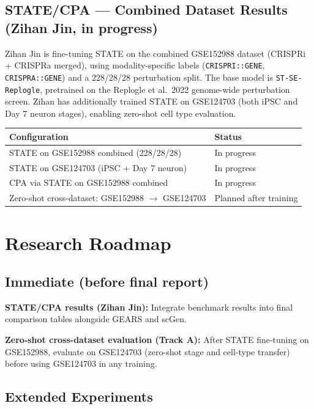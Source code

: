 \documentclass[11pt,letterpaper]{article}
\begin{document}
\subsection{STATE/CPA --- Combined Dataset Results (Zihan Jin, in progress)}

Zihan Jin is fine-tuning STATE on the combined GSE152988 dataset (CRISPRi + CRISPRa merged),
using modality-specific labels (\texttt{CRISPRI::GENE}, \texttt{CRISPRA::GENE}) and a
228/28/28 perturbation split. The base model is \texttt{ST-SE-Replogle}, pretrained on the
Replogle et al.\ 2022 genome-wide perturbation screen. Zihan has additionally trained STATE on
GSE124703 (both iPSC and Day 7 neuron stages), enabling zero-shot cell type evaluation.

\begin{table}[h]
\centering
\small
\begin{tabular}{ll}
\toprule
Configuration & Status \\
\midrule
STATE on GSE152988 combined (228/28/28) & In progress \\
STATE on GSE124703 (iPSC + Day 7 neuron) & In progress \\
CPA via STATE on GSE152988 combined & In progress \\
Zero-shot cross-dataset: GSE152988 $\to$ GSE124703 & Planned after training \\
\bottomrule
\end{tabular}
\end{table}

\section{Research Roadmap}

\subsection{Immediate (before final report)}

\textbf{STATE/CPA results (Zihan Jin):} Integrate benchmark results into final comparison
tables alongside GEARS and scGen.

\textbf{Zero-shot cross-dataset evaluation (Track A):} After STATE fine-tuning on GSE152988, evaluate on GSE124703
(zero-shot stage and cell-type transfer) before using GSE124703 in any training.

\subsection{Extended Experiments}
\end{document}
